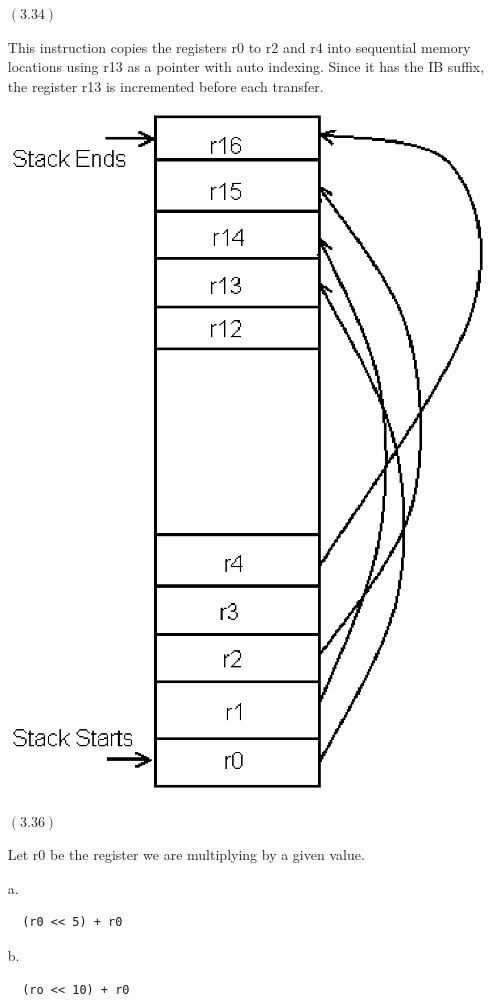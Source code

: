 \documentclass[letterpaper,10pt,titlepage]{article}
\begin{document}
\begin{enumerate}
\item[$(3.34)$]

  This instruction copies the registers r0 to r2 and r4 into sequential memory locations using r13 as a pointer with auto indexing. 
  Since it has the IB suffix, the register r13 is incremented before each transfer.


\includegraphics[scale=.5]{stack.eps}


\item[$(3.36)$] 

  Let r0 be the register we are multiplying by a given value.
  
  a. 
  \begin{lstlisting}
  (r0 << 5) + r0
  \end{lstlisting}
  
  b. 
  \begin{lstlisting}
  (ro << 10) + r0
  \end{lstlisting}
  

\end{enumerate}
\end{document}
